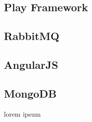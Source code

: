 \documentclass[brudnopis]{xmgr}
\begin{document}
\subsection{Play Framework}

\subsection{RabbitMQ}

\subsection{AngularJS}

\subsection{MongoDB}

\summary
lorem ipsum





\nocite{Hinojosa:2013:TIA}




\listoftables

\listoffigures

\oswiadczenie
\end{document}
